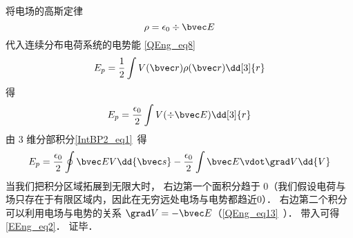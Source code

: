 将电场的高斯定律
\begin{equation}
\rho = \epsilon_0\div \bvec E
\end{equation}
代入连续分布电荷系统的电势能 \autoref{QEng_eq8}~
\begin{equation}
E_p = \frac 12 \int V(\bvec r) \rho(\bvec r) \dd[3]{r}
\end{equation}
得
\begin{equation}
E_p = \frac{\epsilon_0}2 \int V (\div \bvec E) \dd[3]{r}
\end{equation}
由 3 维分部积分\autoref{IntBP2_eq1}~得
\begin{equation}
E_p = \frac{\epsilon_0}2 \oint \bvec E V \dd{\bvec s} - \frac{\epsilon_0}{2} \int \bvec E \vdot \grad V \dd{V}
\end{equation}
当我们把积分区域拓展到无限大时， 右边第一个面积分趋于 0（我们假设电荷与场只存在于有限区域内，因此在无穷远处电场与电势都趋近$0$）． 右边第二个积分可以利用电场与电势的关系 $\grad V = -\bvec E$（\autoref{QEng_eq13}~）． 带入可得\autoref{EEng_eq2}． 证毕．
